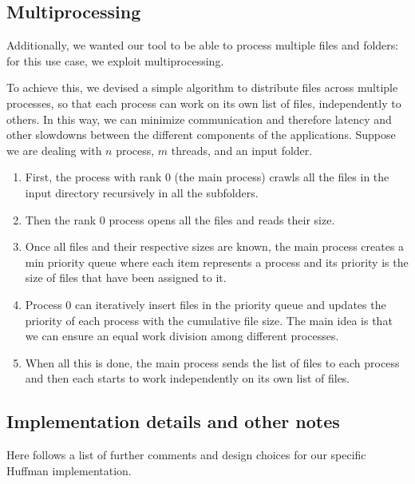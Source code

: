 \subsection{Multiprocessing}

Additionally, we wanted our tool to be able to process multiple files and folders: for this use case, we exploit multiprocessing.

To achieve this, we devised a simple algorithm to distribute files across multiple processes, so that each process can work on its own list of files, independently to others. In this way, we can minimize communication and therefore latency and other slowdowns between the different components of the applications. Suppose we are dealing with \(n\) process, \(m\) threads, and an input folder.

\begin{enumerate}
	\item First, the process with rank 0 (the main process) crawls all the files in the input directory recursively in all the subfolders.
	\item Then the rank 0 process opens all the files and reads their size.
	\item Once all files and their respective sizes are known, the main process creates a min priority queue where each item represents a process and its priority is the size of files that have been assigned to it.
	\item Process 0 can iteratively insert files in the priority queue and updates the priority of each process with the cumulative file size. The main idea is that we can ensure an equal work division among different processes.
	\item When all this is done, the main process sends the list of files to each process and then each starts to work independently on its own list of files.
\end{enumerate}

\subsection{Implementation details and other notes}
Here follows a list of further comments and design choices for our specific Huffman implementation. 

